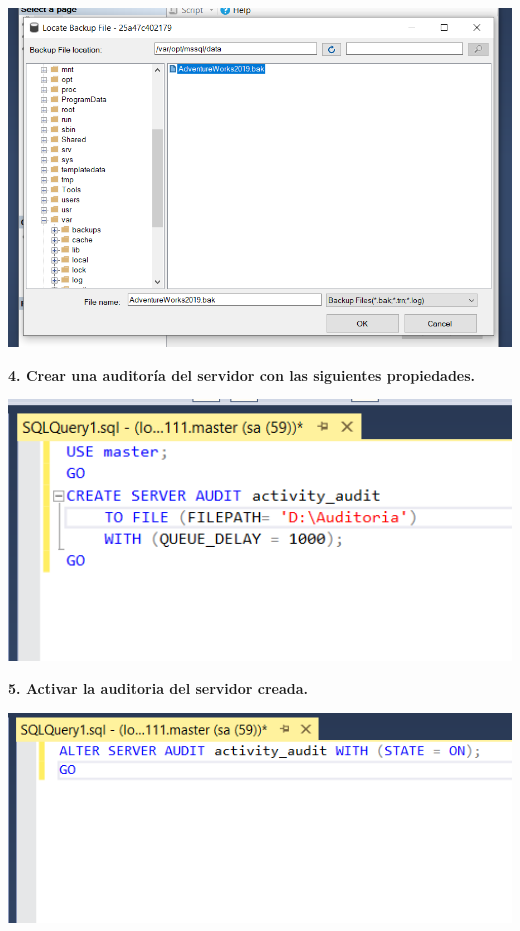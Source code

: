 \documentclass{article}
\begin{document}
    \begin{center}
		\includegraphics[width=15cm]{./images/7} 
	\end{center}
\textbf{4. Crear una auditoría del servidor con las siguientes propiedades.}

    \begin{center}
		\includegraphics[width=15cm]{./images/8} 
	\end{center}
	

\textbf{5.  Activar la auditoria del servidor creada.}

   \begin{center}
		\includegraphics[width=15cm]{./images/9} 
	\end{center}
\end{document}
